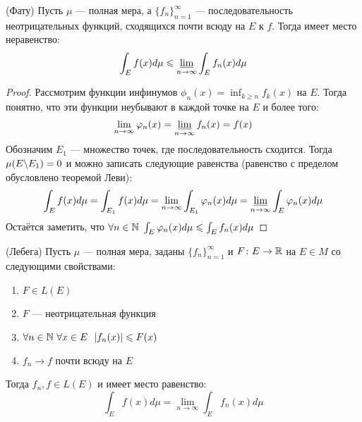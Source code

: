 \begin{theorem} (Фату)
	Пусть $\mu$ --- полная мера, а $\{f_n\}_{n = 1}^\infty$ --- последовательность неотрицательных функций, сходящихся почти всюду на $E$ к $f$. Тогда имеет место неравенство:
	\[
		\int_E f(x)d\mu \le \varliminf_{n \to \infty} \int_E f_n(x)d\mu
	\]
\end{theorem}

\begin{proof}
	Рассмотрим функции инфинумов $\phi_n(x) = \inf_{k \ge n} f_k(x)$ на $E$. Тогда понятно, что эти функции неубывают в каждой точке на $E$ и более того:
	\[
		\lim_{n \to \infty} \phi_n(x) = \varliminf_{n \to \infty} f_n(x) = f(x)
	\]
	Обозначим $E_1$ --- множество точек, где последовательность сходится. Тогда $\mu(E \bs E_1) = 0$ и можно записать следующие равенства (равенство с пределом обусловлено теоремой Леви):
	\[
		\int_E f(x)d\mu = \int_{E_1} f(x)d\mu = \lim_{n \to \infty} \int_{E_1} \phi_n(x)d\mu = \varliminf_{n \to \infty} \int_E \phi_n(x)d\mu
	\]
	Остаётся заметить, что $\forall n \in \N\ \int_E \phi_n(x)d\mu \le \int_E f_n(x)d\mu$
\end{proof}

\begin{theorem} (Лебега)
	Пусть $\mu$ --- полная мера, заданы $\{f_n\}_{n = 1}^\infty$ и $F \colon E \to \R$ на $E \in M$ со следующими свойствами:
	\begin{enumerate}
		\item $F \in L(E)$
		
		\item $F$ --- неотрицательная функция
		
		\item $\forall n \in \N\ \forall x \in E\ \ |f_n(x)| \le F(x)$
		
		\item $f_n \to f$ почти всюду на $E$
	\end{enumerate}
	Тогда $f_n, f \in L(E)$ и имеет место равенство:
	\[
		\int_E f(x)d\mu = \lim_{n \to \infty} \int_E f_n(x)d\mu
	\]
\end{theorem}

